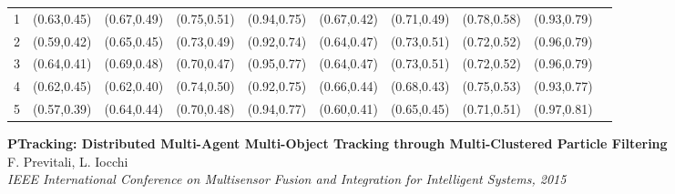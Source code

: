\begin{frame}
\begin{table}[!t]
\begin{tabular}{ccccc|ccccc}
			\multicolumn{1}{c|}{1} & (0.63,0.45) & (0.67,0.49) & (0.75,0.51) & (0.94,0.75)
								   & (0.67,0.42) & (0.71,0.49) & (0.78,0.58) & (0.93,0.79) \\
			\multicolumn{1}{c|}{2} & (0.59,0.42) & (0.65,0.45) & (0.73,0.49) & (0.92,0.74)
								   & (0.64,0.47) & (0.73,0.51) & (0.72,0.52) & (0.96,0.79) \\
			\multicolumn{1}{c|}{3} & (0.64,0.41) & (0.69,0.48) & (0.70,0.47) & (0.95,0.77)
								   & (0.64,0.47) & (0.73,0.51) & (0.72,0.52) & (0.96,0.79) \\
			\multicolumn{1}{c|}{4} & (0.62,0.45) & (0.62,0.40) & (0.74,0.50) & (0.92,0.75)
								   & (0.66,0.44) & (0.68,0.43) & (0.75,0.53) & (0.93,0.77) \\
			\multicolumn{1}{c|}{5} & (0.57,0.39) & (0.64,0.44) & (0.70,0.48) & (0.94,0.77)
								   & (0.60,0.41) & (0.65,0.45) & (0.71,0.51) & (0.97,0.81) \\
			\hline
		\end{tabular}
	\end{table}
	
	\vspace{0.455cm}
	
	\tiny
	
	\textbf{PTracking: Distributed Multi-Agent Multi-Object Tracking through Multi-Clustered Particle
	Filtering} \\
	F. Previtali, L. Iocchi \\
	\emph{IEEE International Conference on Multisensor Fusion and Integration for Intelligent Systems,
	2015} \\
\end{frame}


